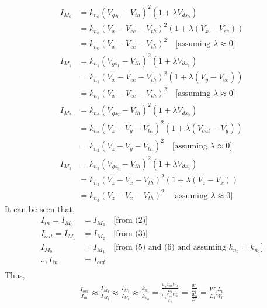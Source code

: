 \begin{enumerate}
    \begin{align*}
      I_{M_0} &= k_{n_0} (V_{gs_0} - V_{th})^2 (1 + \lambda V_{ds_0}) \\
              &= k_{n_0} (V_{x} - V_{ee} - V_{th})^2 (1 + \lambda (V_{x} - V_{ee})) \\
              &= k_{n_0} (V_{x} - V_{ee} - V_{th})^2 \quad \text{[assuming } \lambda \approx 0 \text{]} \tag{5} \\
      I_{M_1} &= k_{n_1} (V_{gs_1} - V_{th})^2 (1 + \lambda V_{ds_1}) \\
              &= k_{n_1} (V_{x} - V_{ee} - V_{th})^2 (1 + \lambda (V_{y} - V_{ee})) \\
              &= k_{n_1} (V_{x} - V_{ee} - V_{th})^2 \quad \text{[assuming } \lambda \approx 0 \text{]} \tag{6} \\
      I_{M_2} &= k_{n_2} (V_{gs_2} - V_{th})^2 (1 + \lambda V_{ds_2}) \\
              &= k_{n_2} (V_{z} - V_{y} - V_{th})^2 (1 + \lambda (V_{out} - V_{y})) \\
              &= k_{n_2} (V_{z} - V_{y} - V_{th})^2 \quad \text{[assuming } \lambda \approx 0 \text{]} \tag{7} \\
      I_{M_3} &= k_{n_3} (V_{gs_3} - V_{th})^2 (1 + \lambda V_{ds_3}) \\
              &= k_{n_3} (V_{z} - V_{x} - V_{th})^2 (1 + \lambda (V_{z} - V_{x})) \\
              &= k_{n_3} (V_{z} - V_{x} - V_{th})^2 \quad \text{[assuming } \lambda \approx 0 \text{]} \tag{8}
    \end{align*}
    It can be seen that,
    \begin{align*}
      I_{in} = I_{M_0} &= I_{M_3} \quad \text{[from (2)]} \\
      I_{out} = I_{M_1} &= I_{M_2} \quad \text{[from (3)]} \\
      I_{M_0} &= I_{M_1} \quad \text{[from (5) and (6) and assuming } k_{n_0} = k_{n_1} \text{]} \\
      \therefore, I_{in} &= I_{out} \\
    \end{align*}
    Thus,
    \begin{align*}
      \frac{I_{out}}{I_{in}} \approx \frac{I_{M_2}}{I_{M_3}} \approx \frac{I_{M_1}}{I_{M_0}}
                                                                    \approx \frac{k_{n_1}}{k_{n_0}} = \frac{\frac{\mu_n C_{ox} W_1}{L_1}}{\frac{\mu_n C_{ox} W_0}{L_0}} = \frac{\frac{W_1}{L_1}}{\frac{W_0}{L_0}} = \frac{W_1 L_0}{L_1 W_0}

\end{align*}
\end{enumerate}

